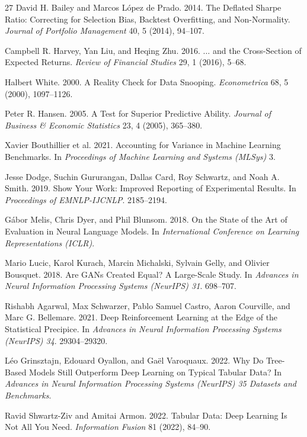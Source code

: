 \documentclass[sigconf,review,anonymous]{acmart}
\begin{document}
\begin{thebibliography}{27}
David H. Bailey and Marcos L\'opez de Prado. 2014. The Deflated Sharpe Ratio: Correcting for Selection Bias, Backtest Overfitting, and Non-Normality. \textit{Journal of Portfolio Management} 40, 5 (2014), 94--107.

Campbell R. Harvey, Yan Liu, and Heqing Zhu. 2016. $\ldots$ and the Cross-Section of Expected Returns. \textit{Review of Financial Studies} 29, 1 (2016), 5--68.

Halbert White. 2000. A Reality Check for Data Snooping. \textit{Econometrica} 68, 5 (2000), 1097--1126.

Peter R. Hansen. 2005. A Test for Superior Predictive Ability. \textit{Journal of Business \& Economic Statistics} 23, 4 (2005), 365--380.

Xavier Bouthillier et al. 2021. Accounting for Variance in Machine Learning Benchmarks. In \textit{Proceedings of Machine Learning and Systems (MLSys)} 3.

Jesse Dodge, Suchin Gururangan, Dallas Card, Roy Schwartz, and Noah A. Smith. 2019. Show Your Work: Improved Reporting of Experimental Results. In \textit{Proceedings of EMNLP-IJCNLP}. 2185--2194.

G\'abor Melis, Chris Dyer, and Phil Blunsom. 2018. On the State of the Art of Evaluation in Neural Language Models. In \textit{International Conference on Learning Representations (ICLR)}.

Mario Lucic, Karol Kurach, Marcin Michalski, Sylvain Gelly, and Olivier Bousquet. 2018. Are GANs Created Equal? A Large-Scale Study. In \textit{Advances in Neural Information Processing Systems (NeurIPS) 31}. 698--707.

Rishabh Agarwal, Max Schwarzer, Pablo Samuel Castro, Aaron Courville, and Marc G. Bellemare. 2021. Deep Reinforcement Learning at the Edge of the Statistical Precipice. In \textit{Advances in Neural Information Processing Systems (NeurIPS) 34}. 29304--29320.

L\'eo Grinsztajn, Edouard Oyallon, and Ga\"el Varoquaux. 2022. Why Do Tree-Based Models Still Outperform Deep Learning on Typical Tabular Data? In \textit{Advances in Neural Information Processing Systems (NeurIPS) 35 Datasets and Benchmarks}.

Ravid Shwartz-Ziv and Amitai Armon. 2022. Tabular Data: Deep Learning Is Not All You Need. \textit{Information Fusion} 81 (2022), 84--90.


\end{thebibliography}
\end{document}
